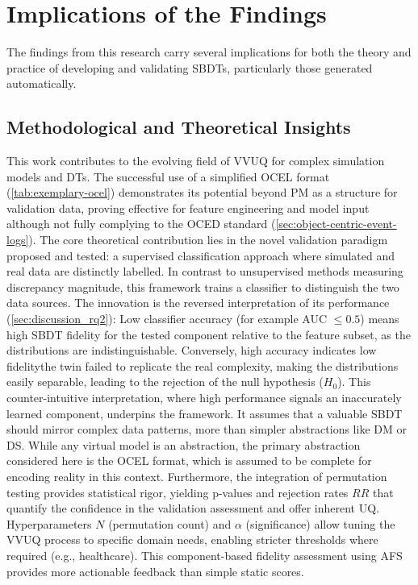 \section{Implications of the Findings}
\label{sec:discussion_implications}

The findings from this research carry several implications for both the theory and practice of developing and validating SBDTs, particularly those generated automatically.

\subsection{Methodological and Theoretical Insights}
\label{sec:implications_theoretical}

This work contributes to the evolving field of VVUQ for complex simulation models and DTs. The successful use of a simplified OCEL format (\autoref{tab:exemplary-ocel}) demonstrates its potential beyond PM as a structure for validation data, proving effective for feature engineering and model input although not fully complying to the OCED standard (\autoref{sec:object-centric-event-logs}). The core theoretical contribution lies in the novel validation paradigm proposed and tested: a supervised classification approach where simulated and real data are distinctly labelled. In contrast to unsupervised methods measuring discrepancy magnitude, this framework trains a classifier to distinguish the two data sources. The innovation is the reversed interpretation of its performance (\autoref{sec:discussion_rq2}): Low classifier accuracy (for example AUC $\le 0.5$) means high SBDT fidelity for the tested component relative to the feature subset, as the distributions are indistinguishable. Conversely, high accuracy indicates low fidelity\textemdash the twin failed to replicate the real complexity, making the distributions easily separable, leading to the rejection of the null hypothesis ($H_0$). This counter-intuitive interpretation, where high performance signals an inaccurately learned component, underpins the framework. It assumes that a valuable SBDT should mirror complex data patterns, more than simpler abstractions like DM or DS. While any virtual model is an abstraction, the primary abstraction considered here is the OCEL format, which is assumed to be complete for encoding reality in this context. Furthermore, the integration of permutation testing provides statistical rigor, yielding p-values and rejection rates $RR$ that quantify the confidence in the validation assessment and offer inherent UQ. Hyperparameters $N$ (permutation count) and $\alpha$ (significance) allow tuning the VVUQ process to specific domain needs, enabling stricter thresholds where required (e.g., healthcare). This component-based fidelity assessment using AFS provides more actionable feedback than simple static scores.

